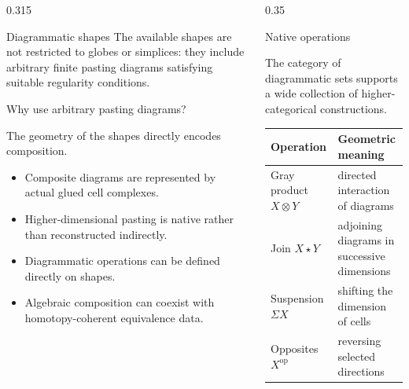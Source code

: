 \documentclass[final]{beamer}
\newcommand{\Gray}{\otimes}
\newcommand{\op}{\mathrm{op}}
\begin{document}
\begin{frame}[fragile, t]
\begin{columns}[t,totalwidth=\textwidth]
\begin{column}{0.315\textwidth}
\begin{block}{Diagrammatic shapes}
The available shapes are not restricted to globes or simplices:
they include arbitrary finite pasting diagrams satisfying suitable
regularity conditions.

\end{block}

\begin{block}{Why use arbitrary pasting diagrams?}

The geometry of the shapes directly encodes composition.

\begin{itemize}
  \item Composite diagrams are represented by actual glued cell complexes.
  \item Higher-dimensional pasting is native rather than reconstructed indirectly.
  \item Diagrammatic operations can be defined directly on shapes.
  \item Algebraic composition can coexist with homotopy-coherent equivalence data.
\end{itemize}

\end{block}

\end{column}


\begin{column}{0.35\textwidth}

\begin{block}{Native operations}

The category of diagrammatic sets supports a wide collection of
higher-categorical constructions.

\begin{center}
\renewcommand{\arraystretch}{1.4}
\begin{tabular}{@{}ll@{}}
\toprule
\textbf{Operation} & \textbf{Geometric meaning} \\
\midrule
Gray product $X\Gray Y$
  & directed interaction of diagrams \\

Join $X\star Y$
  & adjoining diagrams in successive dimensions \\

Suspension $\Sigma X$
  & shifting the dimension of cells \\

Opposites $X^{\op}$
  & reversing selected directions \\


\end{tabular}
\end{center}
\end{block}
\end{column}
\end{columns}
\end{frame}
\end{document}
